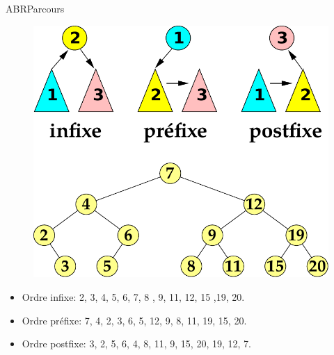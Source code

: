 \documentclass[12pt,a4paper]{beamer}
\begin{document}
\begin{frame}{ABR}{Parcours}
\vspace{-2em}
\begin{figure}
\includegraphics[scale=0.5]{figs/parcours_tree}
\end{figure}
\begin{itemize}
\item Ordre infixe: 2, 3, 4, 5, 6, 7, 8 , 9, 11, 12, 15 ,19, 20. 
\item Ordre préfixe: 7, 4, 2, 3, 6, 5, 12, 9, 8, 11, 19, 15, 20.
\item Ordre postfixe: 3, 2, 5, 6, 4, 8, 11, 9, 15, 20, 19, 12, 7.
\end{itemize}
\end{frame}
\end{document}
